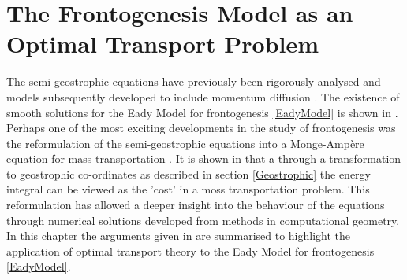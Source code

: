 \chapter{The Frontogenesis Model as an Optimal Transport Problem}
The semi-geostrophic equations have previously been rigorously analysed \cite{Hoskins1975,Bannon1988,Cullen1993} and models subsequently developed to include momentum diffusion \cite{Blumen1990, Nakamura1994}. The existence of smooth solutions for the Eady Model for frontogenesis \ref{EadyModel} is shown in \cite{Brenier2009}. Perhaps one of the most exciting developments in the study of frontogenesis was the reformulation of the semi-geostrophic equations into a Monge-Amp\`{e}re equation for mass transportation \cite{Benamou1998} . It is shown in \cite{Cullen2006a} that a through a transformation to geostrophic co-ordinates as described in section \ref{Geostrophic} the energy integral can be viewed as the 'cost' in a moss transportation problem. This reformulation has allowed a deeper insight into the behaviour of the equations through numerical solutions developed from methods in computational geometry. In this chapter the arguments given in \cite{Cullen2006a} are summarised to highlight the application of optimal transport theory to the Eady Model for frontogenesis \ref{EadyModel}.
